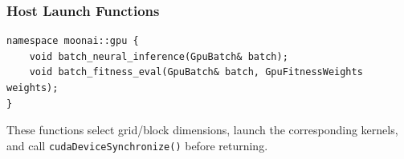 \subsubsection{Host Launch Functions}

\begin{lstlisting}
namespace moonai::gpu {
    void batch_neural_inference(GpuBatch& batch);
    void batch_fitness_eval(GpuBatch& batch, GpuFitnessWeights weights);
}
\end{lstlisting}

These functions select grid/block dimensions, launch the corresponding kernels, and call
\texttt{cudaDeviceSynchronize()} before returning.
